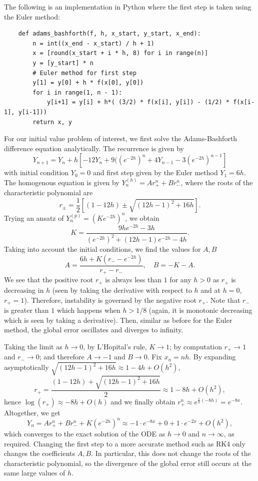 \documentclass{article}
\begin{document}
The following is an implementation in Python where the first step is taken using the Euler method:

\begin{verbatim}
    def adams_bashforth(f, h, x_start, y_start, x_end):
        n = int((x_end - x_start) / h + 1)
        x = [round(x_start + i * h, 8) for i in range(n)]
        y = [y_start] * n
        # Euler method for first step
        y[1] = y[0] + h * f(x[0], y[0])
        for i in range(1, n - 1):
            y[i+1] = y[i] + h*( (3/2) * f(x[i], y[i]) - (1/2) * f(x[i-1], y[i-1]))
        return x, y
\end{verbatim}

For our initial value problem of interest, we first solve the Adams-Bashforth difference equation analytically. The recurrence is given by
\[ Y_{n+1} = Y_n + h[-12Y_n + 9((e^{-2h})^n + 4Y_{n-1} - 3(e^{-2h})^{n-1}] \]
with initial condition \(Y_0 = 0\) and first step given by the Euler method \(Y_1 = 6h\). The homogenous equation is given by \(Y^{(h)}_n = Ar_{+}^n + Br_{-}^n\), where the roots of the characteristic polynomial are
\[ r_{\pm} = \frac{1}{2}\left[(1-12h) \pm \sqrt{(12h-1)^2 + 16h}\right]. \]
Trying an ansatz of \(Y^{(p)}_n= (Ke^{-2h})^n\), we obtain
\[ K = \frac{9he^{-2h} -3h}{(e^{-2h})^2 + (12h-1)e^{-2h} - 4h}. \]
Taking into account the initial conditions, we find the values for \(A, B\)
\[ A = \frac{6h + K(r_{-} - e^{-2h})}{r_+ - r_-}, \quad B = -K - A. \]
We see that the positive root \(r_+\) is always less than \(1\) for any \(h > 0\) as \(r_+\) is decreasing in \(h\) (seen by taking the derivative with respect to \(h\) and at \(h = 0\), \(r_+ = 1\)). Therefore, instability is governed by the negative root \(r_+\). Note that \(r_-\) is greater than \(1\) which happens when \(h > 1/8\) (again, it is monotonic decreasing which is seen by taking a derivative). Then, similar as before for the Euler method, the global error oscillates and diverges to infinity. 

Taking the limit as \(h \to 0\), by L'Hopital's rule, \(K \to 1\); by computation \(r_+ \to 1\) and \(r_- \to 0\); and therefore \(A \to -1\) and \(B \to 0\). Fix \(x_n = nh\). By expanding asymptotically \(\sqrt{(12h-1)^2 + 16h} \approx 1 - 4h + O(h^2)\),
\[ r_+ = \frac{(1 - 12h) + \sqrt{(12h-1)^2 + 16h}}{2} \approx 1 - 8h + O(h^2), \]
hence \(\log(r_+) \approx-8h + O(h)\) and we finally obtain \(r_+^n \approx e^{\frac{x}{h}(-8h)} = e^{-8x}\). Altogether, we get
\[ Y_n = Ar_+^n + Br_-^n + K(e^{-2h})^n \approx -1\cdot e^{-8x} + 0 + 1\cdot e^{-2x} + O(h^2), \]
which converges to the exact solution of the ODE as \(h \to 0\) and \(n \to \infty\), as required. Changing the first step to a more accurate method such as RK4 only changes the coefficients \(A, B\). In particular, this does not change the roots of the characteristic polynomial, so the divergence of the global error still occurs at the same large values of \(h\).
\end{document}
